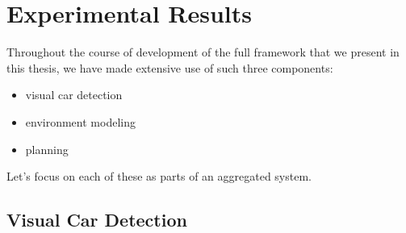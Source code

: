 
\chapter{Experimental Results}\label{cha:experimental_results}
    Throughout the course of development of the full framework that we present in this thesis, we have made extensive use of such three components:
    \begin{itemize}
        \item visual car detection
        \item environment modeling
        \item planning
    \end{itemize}
    Let's focus on each of these as parts of an aggregated system.
    \section{Visual Car Detection}\label{sec:visual_car_detection}
